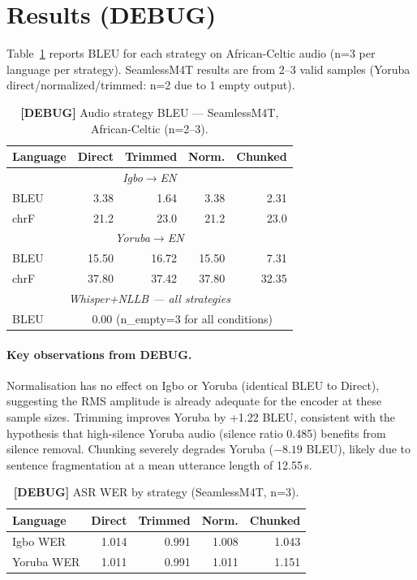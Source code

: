 \documentclass[a4paper]{article}
\newcommand{\dataAC}{African-Celtic}
\begin{document}
\section{Results (DEBUG)}
\label{sec:results}

Table~\ref{tab:debug_audio_bleu} reports BLEU for each strategy on \dataAC{} audio (n=3 per language per strategy). SeamlessM4T results are from 2–3 valid samples (Yoruba direct/normalized/trimmed: n=2 due to 1 empty output).

\begin{table}[t]
\centering
\small
\caption{\textbf{[DEBUG]} Audio strategy BLEU — SeamlessM4T, \dataAC{} (n=2–3).}
\label{tab:debug_audio_bleu}
\begin{tabular}{lrrrr}
\toprule
\textbf{Language} & \textbf{Direct} & \textbf{Trimmed} & \textbf{Norm.} & \textbf{Chunked} \\
\midrule
\multicolumn{5}{c}{\textit{Igbo$\to$EN}} \\
BLEU  & 3.38 & 1.64 & 3.38 & 2.31 \\
chrF  & 21.2 & 23.0 & 21.2 & 23.0 \\
\midrule
\multicolumn{5}{c}{\textit{Yoruba$\to$EN}} \\
BLEU  & 15.50 & 16.72 & 15.50 & 7.31 \\
chrF  & 37.80 & 37.42 & 37.80 & 32.35 \\
\midrule
\multicolumn{5}{c}{\textit{Whisper+NLLB — all strategies}} \\
BLEU  & \multicolumn{4}{c}{0.00 (n\_empty=3 for all conditions)} \\
\bottomrule
\end{tabular}
\end{table}

\paragraph{Key observations from DEBUG.}
Normalisation has no effect on Igbo or Yoruba (identical BLEU to Direct), suggesting the RMS amplitude is already adequate for the encoder at these sample sizes. Trimming improves Yoruba by +1.22 BLEU, consistent with the hypothesis that high-silence Yoruba audio (silence ratio 0.485) benefits from silence removal. Chunking severely degrades Yoruba ($-8.19$ BLEU), likely due to sentence fragmentation at a mean utterance length of 12.55\,s.

\begin{table}[t]
\centering
\small
\caption{\textbf{[DEBUG]} ASR WER by strategy (SeamlessM4T, n=3).}
\label{tab:debug_audio_wer}
\begin{tabular}{lrrrr}
\toprule
\textbf{Language} & \textbf{Direct} & \textbf{Trimmed} & \textbf{Norm.} & \textbf{Chunked} \\
\midrule
Igbo WER   & 1.014 & 0.991 & 1.008 & 1.043 \\
Yoruba WER & 1.011 & 0.991 & 1.011 & 1.151 \\
\bottomrule
\end{tabular}
\end{table}
\end{document}
